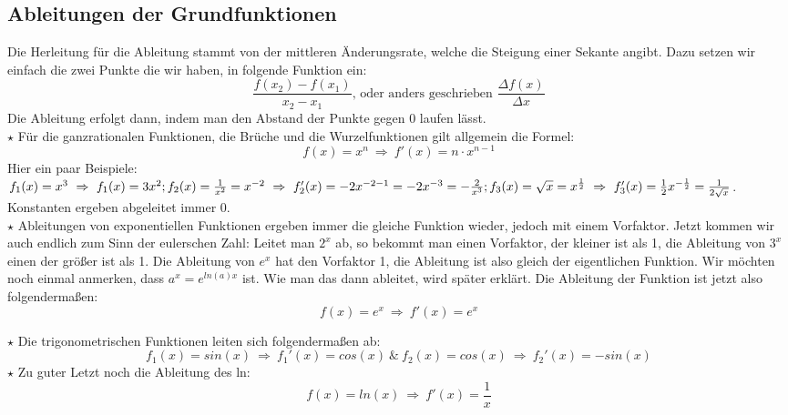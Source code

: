 \subsection{Ableitungen der Grundfunktionen}
	Die Herleitung für die Ableitung stammt von der mittleren Änderungsrate, welche
	die Steigung einer Sekante angibt. Dazu setzen wir einfach die zwei Punkte die
	wir haben, in folgende Funktion ein:
	\[\frac{f(x_2)-f(x_1)}{x_2-x_1}\textrm{, oder anders geschrieben } \frac{\Delta
	f(x)}{\Delta x}\]
	Die Ableitung erfolgt dann, indem man den Abstand der Punkte
	gegen 0 laufen lässt.\\

	\(\star\) Für die ganzrationalen Funktionen, die Brüche und die
	Wurzelfunktionen gilt allgemein die Formel:
	\[f(x)=x^n\ \Rightarrow\ f'(x)=n\cdot x^{n-1}\]
	Hier ein paar Beispiele: \(f_1(x)=x^3\ \Rightarrow\ f_1(x)=3x^2;\\
	f_2(x)=\frac{1}{x^2}=x^{-2}\ \Rightarrow\
	f_2'(x)=-2x^{-2-1}=-2x^{-3}=-\frac{2}{x^3};\\
	f_3(x)=\sqrt{x}=x^{\frac{1}{2}}\
	\Rightarrow\ f_3'(x)=\frac{1}{2}x^{-\frac{1}{2}}=\frac{1}{2\sqrt{x}}\).\\
	Konstanten ergeben abgeleitet immer 0.\\

	\(\star\) Ableitungen von exponentiellen Funktionen ergeben immer die gleiche
	Funktion wieder, jedoch mit einem Vorfaktor. Jetzt kommen wir auch endlich zum
	Sinn der eulerschen Zahl: Leitet man \(2^x\) ab, so bekommt man einen
	Vorfaktor, der kleiner ist als 1, die Ableitung von \(3^x\) einen der größer
	ist als 1. Die Ableitung von \(e^x\) hat den Vorfaktor 1, die Ableitung ist
	also gleich der eigentlichen Funktion. Wir möchten noch einmal anmerken, dass
	\(a^x=e^{ln(a)x}\) ist. Wie man das dann ableitet, wird später erklärt. Die
	Ableitung der Funktion ist jetzt also folgendermaßen:
	\[f(x)=e^x\ \Rightarrow\ f'(x)=e^x\]

	\(\star\) Die trigonometrischen Funktionen leiten sich folgendermaßen ab:
	\[f_1(x)=sin(x)\ \Rightarrow\ f_1'(x)=cos(x)\ \&\ f_2(x)=cos(x)\ \Rightarrow\
	f_2'(x)=-sin(x)\]
	\(\star\) Zu guter Letzt noch die Ableitung des ln:
	\[f(x)=ln(x)\ \Rightarrow\ f'(x)=\frac{1}{x}\]
